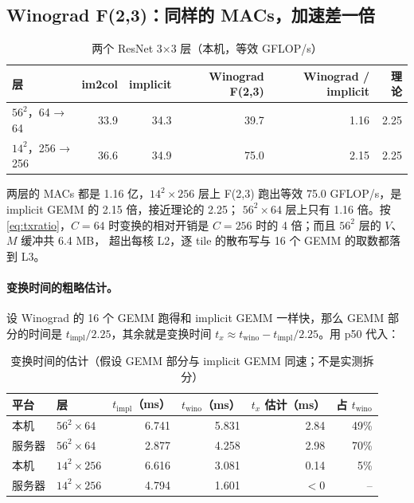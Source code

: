 \documentclass[11pt,a4paper]{ctexart}
\begin{document}
\subsection{Winograd F(2,3)：同样的 MACs，加速差一倍}\label{sec:res-wino}

\begin{table}[H]
\centering\small
\caption{两个 ResNet 3×3 层（本机，等效 GFLOP/s）}\label{tab:wino}
\begin{tabular}{lrrrrr}
\toprule
层 & im2col & implicit & Winograd F(2,3) & Winograd / implicit & 理论 \\
\midrule
$56^2$，64 → 64 & 33.9 & 34.3 & 39.7 & 1.16 & 2.25 \\
$14^2$，256 → 256 & 36.6 & 34.9 & 75.0 & 2.15 & 2.25 \\
\bottomrule
\end{tabular}
\end{table}

两层的 MACs 都是 1.16 亿，$14^2\times256$ 层上 F(2,3) 跑出等效 75.0 GFLOP/s，是 implicit GEMM 的 2.15 倍，接近理论的 2.25；
$56^2\times64$ 层上只有 1.16 倍。按 \cref{eq:txratio}，$C = 64$ 时变换的相对开销是 $C = 256$ 时的 4 倍；而且 $56^2$ 层的 $V$、$M$ 缓冲共 6.4 MB，
超出每核 L2，逐 tile 的散布写与 16 个 GEMM 的取数都落到 L3。

\paragraph{变换时间的粗略估计。} 设 Winograd 的 16 个 GEMM 跑得和 implicit GEMM 一样快，那么 GEMM 部分的时间是 $t_\text{impl}/2.25$，其余就是变换时间
$t_x \approx t_\text{wino} - t_\text{impl}/2.25$。用 p50 代入：

\begin{table}[H]
\centering\small
\caption{变换时间的估计（假设 GEMM 部分与 implicit GEMM 同速；不是实测拆分）}\label{tab:tx}
\begin{tabular}{llrrrr}
\toprule
平台 & 层 & $t_\text{impl}$（ms） & $t_\text{wino}$（ms） & $t_x$ 估计（ms） & 占 $t_\text{wino}$ \\
\midrule
本机 & $56^2\times64$ & 6.741 & 5.831 & 2.84 & 49\% \\
服务器 & $56^2\times64$ & 2.877 & 4.258 & 2.98 & 70\% \\
本机 & $14^2\times256$ & 6.616 & 3.081 & 0.14 & 5\% \\
服务器 & $14^2\times256$ & 4.794 & 1.601 & $<0$ & -- \\
\bottomrule
\end{tabular}
\end{table}
\end{document}
